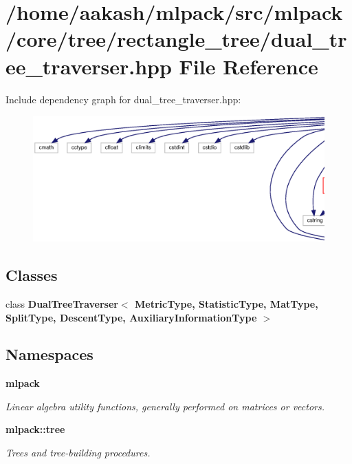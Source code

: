 \section{/home/aakash/mlpack/src/mlpack/core/tree/rectangle\+\_\+tree/dual\+\_\+tree\+\_\+traverser.hpp File Reference}
\label{rectangle__tree_2dual__tree__traverser_8hpp}
Include dependency graph for dual\+\_\+tree\+\_\+traverser.\+hpp\+:
\nopagebreak
\begin{figure}[H]
\begin{center}
\leavevmode
\includegraphics[width=350pt]{rectangle__tree_2dual__tree__traverser_8hpp__incl}
\end{center}
\end{figure}
\subsection*{Classes}
\begin{DoxyCompactItemize}
\item 
class \textbf{ Dual\+Tree\+Traverser$<$ Metric\+Type, Statistic\+Type, Mat\+Type, Split\+Type, Descent\+Type, Auxiliary\+Information\+Type $>$}
\end{DoxyCompactItemize}
\subsection*{Namespaces}
\begin{DoxyCompactItemize}
\item 
 \textbf{ mlpack}
\begin{DoxyCompactList}\small\item\em Linear algebra utility functions, generally performed on matrices or vectors. \end{DoxyCompactList}\item 
 \textbf{ mlpack\+::tree}
\begin{DoxyCompactList}\small\item\em Trees and tree-\/building procedures. \end{DoxyCompactList}\end{DoxyCompactItemize}


